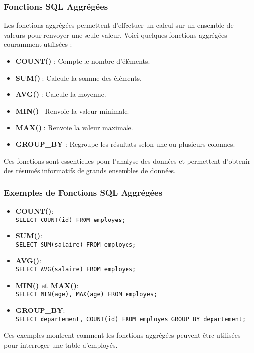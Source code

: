 \begin{frame}
  \frametitle{Fonctions SQL Aggrégées}

  Les fonctions aggrégées permettent d'effectuer un calcul sur un ensemble de valeurs pour renvoyer une seule valeur. Voici quelques fonctions aggrégées couramment utilisées :

  \begin{itemize}
    \item \textbf{COUNT()} : Compte le nombre d'éléments.
    \item \textbf{SUM()} : Calcule la somme des éléments.
    \item \textbf{AVG()} : Calcule la moyenne.
    \item \textbf{MIN()} : Renvoie la valeur minimale.
    \item \textbf{MAX()} : Renvoie la valeur maximale.
    \item \textbf{GROUP\_BY} : Regroupe les résultats selon une ou plusieurs colonnes.
  \end{itemize}

  Ces fonctions sont essentielles pour l'analyse des données et permettent d'obtenir des résumés informatifs de grands ensembles de données.

\end{frame}

\begin{frame}
  \frametitle{Exemples de Fonctions SQL Aggrégées}

  \begin{itemize}
    \item \textbf{COUNT()}: \\
      \texttt{SELECT COUNT(id) FROM employes;}
    \item \textbf{SUM()}: \\
      \texttt{SELECT SUM(salaire) FROM employes;}
    \item \textbf{AVG()}: \\
      \texttt{SELECT AVG(salaire) FROM employes;}
    \item \textbf{MIN() et MAX()}: \\
      \texttt{SELECT MIN(age), MAX(age) FROM employes;}
    \item \textbf{GROUP\_BY}: \\
      \texttt{SELECT departement, COUNT(id) FROM employes GROUP BY departement;}
  \end{itemize}

  Ces exemples montrent comment les fonctions aggrégées peuvent être utilisées pour interroger une table d'employés.

\end{frame}

